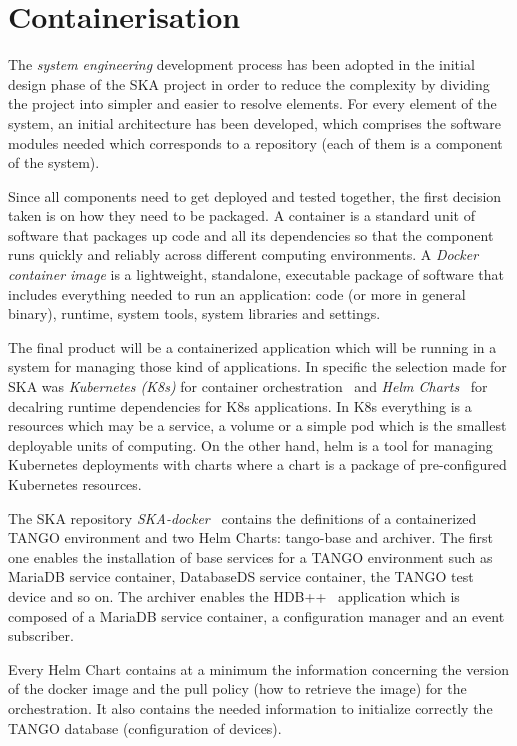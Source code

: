 \documentclass[a4paper]{spie}  %
\begin{document}
\section{Containerisation} \label{SKA-docker}
The \textit{system engineering} development process has been adopted in the initial design phase of the SKA project in order to reduce the complexity by dividing the project into simpler and easier to resolve elements. For every element of the system, an initial architecture has been developed, which comprises the software modules needed which corresponds to a repository (each of them is a component of the system).

Since all components need to get deployed and tested together, the first decision taken is on how they need to be packaged.  A container is a standard unit of software that packages up code and all its dependencies so that the component runs quickly and reliably across different computing environments. A \textit{Docker container image} is a lightweight, standalone, executable package of software that includes everything needed to run an application: code (or more in general binary), runtime, system tools, system libraries and settings.

The final product will be a containerized application which will be running in a system for managing those kind of applications. In specific the selection made for SKA was \textit{Kubernetes (K8s)} for container orchestration~\cite{kubernetes} and \textit{Helm Charts}~\cite{helm} for decalring runtime dependencies for K8s applications. In K8s everything is a resources which may be a service, a volume or a simple pod which is the smallest deployable units of computing. On the other hand, helm is a tool for managing Kubernetes deployments with charts where a chart is a package of pre-configured Kubernetes resources.

The SKA repository \textit{SKA-docker}~\cite{SKA-docker} contains the definitions of a containerized TANGO environment and two Helm Charts: tango-base and archiver. The first one enables the installation of base services for a TANGO environment such as MariaDB service container, DatabaseDS service container, the TANGO test device and so on. The archiver enables the HDB++~\cite{hdb} application which is composed of a MariaDB service container, a configuration manager and an event subscriber.

Every Helm Chart contains at a minimum the information concerning the version of the docker image and the pull policy (how to retrieve the image) for the orchestration. It also contains the needed information to initialize correctly the TANGO database (configuration of devices).
\end{document}
